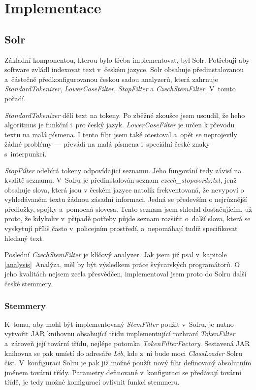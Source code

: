 \chapter{Implementace}
\section{Solr}
Základní komponentou, kterou bylo třeba implementovat, byl Solr. Potřebuji aby software zvládl indexovat text v~českém jazyce. Solr obsahuje předinstalovanou a~částečně předkonfigurovanou českou sadou analyzerů, která zahrnuje \emph{StandardTokenizer}, \emph{LowerCaseFilter}, \emph{StopFilter} a \emph{CzechStemFilter}. V~tomto pořadí.

\emph{StandardTokenizer} dělí text na tokeny. Po zběžné zkoušce jsem usoudil, že heho algoritmus je funkční i~pro český jazyk. \emph{LowerCaseFilter} je určen k převodu textu na malá písmena. I tento filtr jsem také otestoval a~opět se neprojevily žádné problémy --- převádí na malá písmena i~speciální české znaky s~interpunkcí. 

\emph{StopFilter} odebírá tokeny odpovídající seznamu. Jeho fungování tedy závisí na kvalitě seznamu. V~Solru je předinstalován seznam \emph{czech\_stopwords.txt}, jenž obsahuje slova, která jsou v českém jazyce natolik frekventovaná, že nevypoví o vyhledávaném textu žádnou zásadní informaci. Jedná se především o nejrůznější předložky, spojky a~pomocná slovesa. Tento seznam jsem shledal dostačujícím, už proto, že kdykoliv v~případě potřeby půjde seznam rozšířit o~další slova, která se vyskytují příliš často v~policejním prostředí, a~nepomáhají tudíž specifikovat hledaný text.

Poslední \emph{CzechStemFilter} je klíčový analyzer. Jak jsem již psal v~kapitole \ref{analysis}~Analýza, měl by být výsledkem práce švýcarských programátorů. O jeho kvalitách nejsem zcela přesvědčen, implementoval jsem proto do Solru další české stemmery.

\subsection{Stemmery}
K~tomu, aby mohl být implementovaný \emph{StemFilter} použit v~Solru, je nutno vytvořit JAR knihovnu obsahující třídu implementující rozhraní \emph{TokenFilter} a~zároveň její tovární třídu, nejlépe potomka \emph{TokenFilterFactory}. Sestavená JAR knihovna se pak umístí do adresáře \emph{Lib}, kde z~ní bude moci \emph{ClassLoader} Solru číst. V~konfiguraci Solru je pak již možné použít nový filtr definovaný absolutním jménem tovární třídy. Parametry definované v~konfiguraci se předávají tovární třídě, je tedy možné konfigurací ovlivnit funkci stemmeru.


